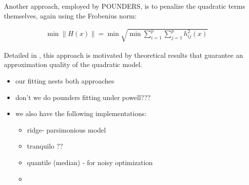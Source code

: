 Another approach, employed by POUNDERS, is to penalize the quadratic terms themselves, again using the Frobenius norm:

\begin{align}
\min\lVert H(x)\rVert =\min\sqrt{\min\sum\limits_{i=1}^p\sum\limits_{j=1}^{p}h_{ij}^2(x)}
\label{eq:min-frob}
\end{align}

Detailed in \cite{Wild2008}, this approach is motivated by theoretical results that guarantee an approximation quality of the quadratic model.

\begin{itemize}
    \item our fitting nests both approaches
    \item don't we do pounders fitting under powell???
    \item we also have the following implementations:
     \begin{itemize}
        \item ridge- parsimonious model
        \item tranquilo ??
        \item quantile (median) - for noisy optimization
        \item
     \end{itemize}
\end{itemize}
